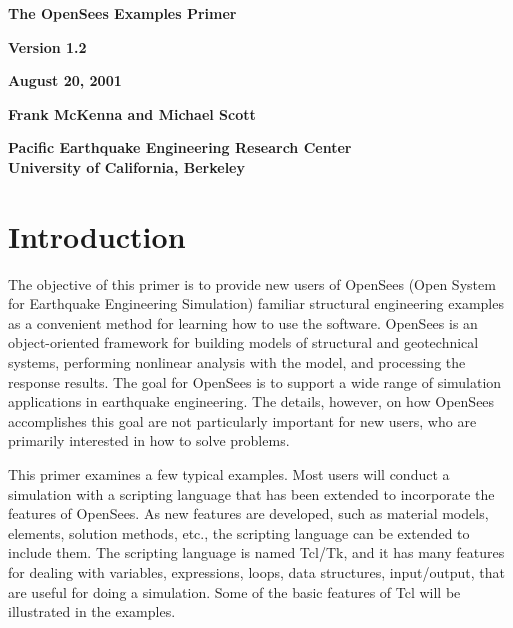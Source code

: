 \documentclass[12pt]{article}
\begin{document}


\begin{center}
{\bf \Large The OpenSees Examples Primer} 

{\bf Version 1.2 } 

{\bf  August 20, 2001} 

{\bf  Frank McKenna and Michael Scott} 

{\bf  Pacific Earthquake Engineering Research Center \\ 
University of California, Berkeley}
\end{center}

\vspace{.2in}
\section*{Introduction}
The objective of this primer is to provide new users of OpenSees
(Open System for Earthquake Engineering Simulation) familiar 
structural engineering examples as a convenient method for learning
how to use the software. OpenSees is an object-oriented framework for
building models of structural and geotechnical systems, performing
nonlinear analysis with the model, and processing the response
results. The goal for OpenSees is to support a wide range of
simulation applications in earthquake engineering.
The details, however, on how OpenSees accomplishes this goal are
not particularly important for new users, who are primarily interested
in how to solve problems.

This primer examines a few typical examples.  Most users will conduct
a simulation with a scripting language that has been extended to
incorporate the features of OpenSees. As new features are developed,
such as material models, elements, solution methods, etc., the
scripting language can be extended to include them. The scripting
language is named Tcl/Tk, and it has many features for dealing with
variables, expressions, loops, data structures, input/output, that are useful for
doing a simulation.  Some of the basic features of Tcl will be illustrated in
the examples.
\end{document}
